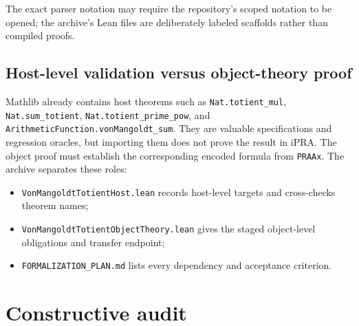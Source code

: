 \documentclass[11pt]{article}
\theoremstyle{definition}
\newcommand{\ipra}{\mathrm{iPRA}}
\newcommand{\code}[1]{\nolinkurl{#1}}
\begin{document}
The exact parser notation may require the repository's scoped notation to be
opened; the archive's Lean files are deliberately labeled scaffolds rather
than compiled proofs.

\subsection{Host-level validation versus object-theory proof}

Mathlib already contains host theorems such as \code{Nat.totient\_mul},
\code{Nat.sum\_totient}, \code{Nat.totient\_prime\_pow}, and
\code{ArithmeticFunction.vonMangoldt\_sum}.  They are valuable specifications
and regression oracles, but importing them does not prove the result in
\(\ipra\).  The object proof must establish the corresponding encoded formula
from \code{PRAAx}.  The archive separates these roles:
\begin{itemize}
\item \code{VonMangoldtTotientHost.lean} records host-level targets and
cross-checks theorem names;
\item \code{VonMangoldtTotientObjectTheory.lean} gives the staged object-level
obligations and transfer endpoint;
\item \code{FORMALIZATION_PLAN.md} lists every dependency and acceptance
criterion.
\end{itemize}

\section{Constructive audit}
\end{document}

